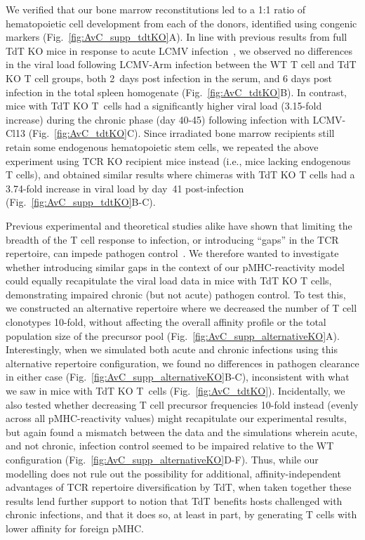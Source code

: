 %
We verified that our bone marrow reconstitutions led to a 1:1 ratio of hematopoietic cell development from each of the donors, identified using congenic markers (Fig.~\ref{fig:AvC_supp_tdtKO}A). In line with previous results from full TdT KO mice in response to acute LCMV infection~\cite{gilfillan1995efficient}, we observed no differences in the viral load following LCMV-Arm infection between the WT T cell and TdT KO T cell groups, both 2~days post infection in the serum, and 6 days post infection in the total spleen homogenate (Fig.~\ref{fig:AvC_tdtKO}B). In contrast, mice with TdT KO T~cells had a significantly higher viral load (3.15-fold increase) during the chronic phase (day 40-45) following infection with LCMV-Cl13 (Fig.~\ref{fig:AvC_tdtKO}C). Since irradiated bone marrow recipients still retain some endogenous hematopoietic stem cells, we repeated the above experiment using TCR\textbeta{} KO recipient mice instead (i.e., mice lacking endogenous \textalpha{}\textbeta{}T cells), and obtained similar results where chimeras with TdT KO T cells had a 3.74-fold increase in viral load by day~41 post-infection (Fig.~\ref{fig:AvC_supp_tdtKO}B-C).

Previous experimental and theoretical studies alike have shown that limiting the breadth of the T cell response to infection, or introducing “gaps” in the TCR repertoire, can impede pathogen control~\cite{meyer2004limited,van2011costimulatory,van2013rate}. We therefore wanted to investigate whether introducing similar gaps in the context of our pMHC-reactivity model could equally recapitulate the viral load data in mice with TdT KO T cells, demonstrating impaired chronic (but not acute) pathogen control. To test this, we constructed an alternative \dTCR{} repertoire where we decreased the number of T cell clonotypes 10-fold, without affecting the overall affinity profile or the total population size of the precursor pool (Fig.~\ref{fig:AvC_supp_alternativeKO}A). Interestingly, when we simulated both acute and chronic infections using this alternative \dTCR{} repertoire configuration, we found no differences in pathogen clearance in either case (Fig.~\ref{fig:AvC_supp_alternativeKO}B-C), inconsistent with what we saw in mice with TdT KO T~cells (Fig.~\ref{fig:AvC_tdtKO}). Incidentally, we also tested whether decreasing T cell precursor frequencies 10-fold instead (evenly across all pMHC-reactivity values) might recapitulate our experimental results, but again found a mismatch between the data and the simulations wherein acute, and not chronic, infection control seemed to be impaired relative to the WT configuration (Fig.~\ref{fig:AvC_supp_alternativeKO}D-F). Thus, while our modelling does not rule out the possibility for additional, affinity-independent advantages of TCR repertoire diversification by TdT, when taken together these results lend further support to notion that TdT benefits hosts challenged with chronic infections, and that it does so, at least in part, by generating T cells with lower affinity for foreign pMHC.



